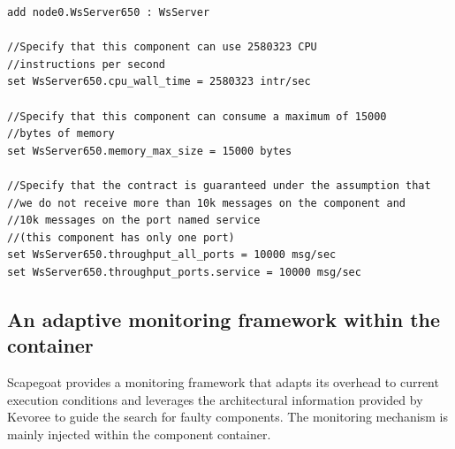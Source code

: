 
\begin{lstlisting}[caption=Component contract specification example,label=contractspec,float=!h]
add node0.WsServer650 : WsServer

//Specify that this component can use 2580323 CPU 
//instructions per second
set WsServer650.cpu_wall_time = 2580323 intr/sec 

//Specify that this component can consume a maximum of 15000
//bytes of memory
set WsServer650.memory_max_size = 15000 bytes

//Specify that the contract is guaranteed under the assumption that 
//we do not receive more than 10k messages on the component and 
//10k messages on the port named service
//(this component has only one port)
set WsServer650.throughput_all_ports = 10000 msg/sec
set WsServer650.throughput_ports.service = 10000 msg/sec
\end{lstlisting}

\subsection{An adaptive monitoring framework within the container} \label{monitorContainer}


Scapegoat provides a monitoring framework that adapts its overhead to current execution conditions and leverages the architectural information provided by Kevoree to guide the search for faulty components.
The monitoring mechanism is mainly injected within the component container. 

